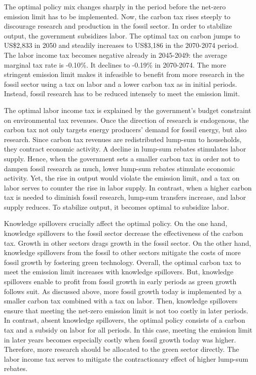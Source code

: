 The optimal policy mix changes sharply in the period before the net-zero emission limit has to be implemented. Now, the carbon tax rises steeply to discourage research and production in the fossil sector. In order to stabilize output, the government subsidizes labor. The optimal tax on carbon jumps to US\$2,833 in 2050 and steadily increases to US\$3,186 in the 2070-2074 period. The labor income tax becomes negative already in 2045-2049: the average marginal tax rate is -0.10\%. It declines to -0.19\% in 2070-2074.
The more stringent emission limit makes it infeasible to benefit from more research in the fossil sector using a tax on labor and a lower carbon tax as in initial periods. Instead, fossil research has to be reduced intensely to meet the emission limit. 



The optimal labor income tax is explained by the government's budget constraint on environmental tax revenues. 
Once the direction of research is endogenous, the carbon tax not only targets energy producers’ demand for fossil energy, but also research. 
Since carbon tax revenues are redistributed lump-sum to households, they contract economic activity. A decline in lump-sum rebates stimulates labor supply. Hence, when the government sets a smaller carbon tax in order not to dampen fossil research as much, lower lump-sum rebates stimulate economic activity. Yet, the rise in output would violate the emission limit, and a tax on labor serves to counter the rise in labor supply. In contrast, when a higher carbon tax is needed to diminish fossil research, lump-sum transfers increase, and labor supply reduces. To stabilize output, it becomes optimal to subsidize labor. 

Knowledge spillovers crucially affect the optimal policy.  On the one hand, knowledge spillovers to the fossil sector decrease the effectiveness of the carbon tax. Growth in other sectors drags growth in the fossil sector. On the other hand, knowledge spillovers from the fossil to other sectors mitigate the costs of more fossil growth by fostering green technology. 
Overall, the optimal carbon tax to meet the emission limit increases with knowledge spillovers. But, knowledge spillovers enable to profit from fossil growth in early periods as green growth follows suit.  As discussed above, more fossil growth today is implemented by a smaller carbon tax combined with a tax on labor. Then, knowledge spillovers ensure that meeting the net-zero emission limit is not too costly in later periods. 
In contrast, absent knowledge spillovers, the optimal policy consists of a carbon tax and a subsidy on labor for all periods. In this case, meeting the emission limit in later years becomes especially costly when fossil growth today was higher. Therefore, more research should be allocated to the green sector directly. The labor income tax serves to mitigate the contractionary effect of higher lump-sum rebates. 

